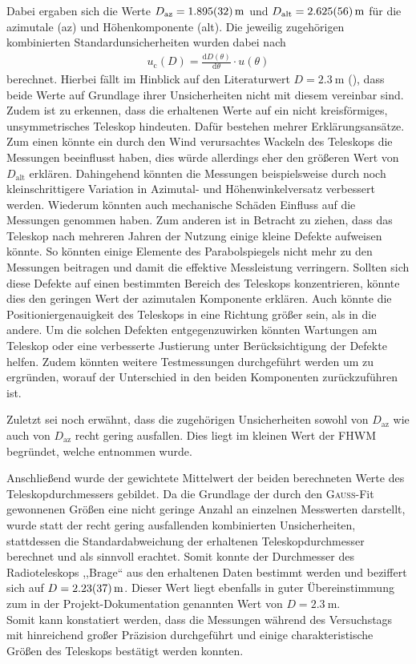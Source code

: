    Dabei ergaben sich die Werte $D_{\text{az}} = \SI{1.895 \pm 0.032}{\metre}$ und $D_{\text{alt}} = \SI{2.625 \pm 0.056}{\metre}$ für die azimutale (az) und Höhenkomponente (alt).
    Die jeweilig zugehörigen kombinierten Standardunsicherheiten wurden dabei nach 
    \begin{align}
        u_{\text{c}}(D) = \frac{\mathrm{d} D(\theta)}{\mathrm{d} \theta} \cdot u(\theta)
    \end{align}
    berechnet.
    Hierbei fällt im Hinblick auf den Literaturwert $D = \SI{2.3}{\metre}$ (\cite{Usermanual}), dass beide Werte auf Grundlage ihrer Unsicherheiten nicht mit diesem vereinbar sind. 
    Zudem ist zu erkennen, dass die erhaltenen Werte auf ein nicht kreisförmiges, unsymmetrisches Teleskop hindeuten. 
    Dafür bestehen mehrer Erklärungsansätze. 
    Zum einen könnte ein durch den Wind verursachtes Wackeln des Teleskops die Messungen beeinflusst haben, dies würde allerdings eher den größeren Wert von $D_{\text{alt}}$ erklären. 
    Dahingehend könnten die Messungen beispielsweise durch noch kleinschrittigere Variation in Azimutal- und Höhenwinkelversatz verbessert werden.
    Wiederum könnten auch mechanische Schäden Einfluss auf die Messungen genommen haben. 
    Zum anderen ist in Betracht zu ziehen, dass das Teleskop nach mehreren Jahren der Nutzung einige kleine Defekte aufweisen könnte. 
    So könnten einige Elemente des Parabolspiegels nicht mehr zu den Messungen beitragen und damit die effektive Messleistung verringern. 
    Sollten sich diese Defekte auf einen bestimmten Bereich des Teleskops konzentrieren, könnte dies den geringen Wert der azimutalen Komponente erklären.
    Auch könnte die Positioniergenauigkeit des Teleskops in eine Richtung größer sein, als in die andere.
    Um die solchen Defekten entgegenzuwirken könnten Wartungen am Teleskop oder eine verbesserte Justierung unter Berücksichtigung der Defekte helfen.
    Zudem könnten weitere Testmessungen durchgeführt werden um zu ergründen, worauf der Unterschied in den beiden Komponenten zurückzuführen ist.

    Zuletzt sei noch erwähnt, dass die zugehörigen Unsicherheiten sowohl von $D_{\text{az}}$ wie auch von $D_{\text{az}}$ recht gering ausfallen. Dies liegt im kleinen Wert der FHWM begründet, welche  entnommen wurde.

    Anschließend wurde der gewichtete Mittelwert der beiden berechneten Werte des Teleskopdurchmessers gebildet. Da die Grundlage der durch den \textsc{Gauß}-Fit gewonnenen Größen eine nicht geringe Anzahl an einzelnen Messwerten darstellt, wurde statt der recht gering ausfallenden kombinierten Unsicherheiten, stattdessen die Standardabweichung der erhaltenen Teleskopdurchmesser berechnet und als sinnvoll erachtet. Somit konnte der Durchmesser des Radioteleskops ,,Brage`` aus den erhaltenen Daten bestimmt werden und beziffert sich auf $D = \SI{2.23 \pm 0.37}{\metre}$. Dieser Wert liegt ebenfalls in guter Übereinstimmung zum in der Projekt-Dokumentation \cite{Usermanual} genannten Wert von $D = \SI{2.3}{\metre}$. \\    
    
    Somit kann konstatiert werden, dass die Messungen während des Versuchstags mit hinreichend großer Präzision durchgeführt und einige charakteristische Größen des Teleskops bestätigt werden konnten.